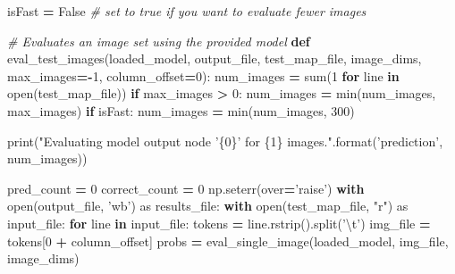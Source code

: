 \documentclass[]{book}
\newenvironment{Shaded}{\begin{snugshade}}{\end{snugshade}}
\newcommand{\KeywordTok}[1]{\textcolor[rgb]{0.13,0.29,0.53}{\textbf{#1}}}
\newcommand{\DecValTok}[1]{\textcolor[rgb]{0.00,0.00,0.81}{#1}}
\newcommand{\CharTok}[1]{\textcolor[rgb]{0.31,0.60,0.02}{#1}}
\newcommand{\SpecialCharTok}[1]{\textcolor[rgb]{0.00,0.00,0.00}{#1}}
\newcommand{\StringTok}[1]{\textcolor[rgb]{0.31,0.60,0.02}{#1}}
\newcommand{\ImportTok}[1]{#1}
\newcommand{\CommentTok}[1]{\textcolor[rgb]{0.56,0.35,0.01}{\textit{#1}}}
\newcommand{\VariableTok}[1]{\textcolor[rgb]{0.00,0.00,0.00}{#1}}
\newcommand{\ControlFlowTok}[1]{\textcolor[rgb]{0.13,0.29,0.53}{\textbf{#1}}}
\newcommand{\OperatorTok}[1]{\textcolor[rgb]{0.81,0.36,0.00}{\textbf{#1}}}
\newcommand{\BuiltInTok}[1]{#1}
\newcommand{\NormalTok}[1]{#1}
\theoremstyle{definition}
\theoremstyle{definition}
\theoremstyle{definition}
\theoremstyle{remark}
\begin{document}
\begin{Shaded}
\begin{Highlighting}[]
\NormalTok{isFast }\OperatorTok{=} \VariableTok{False} \CommentTok{# set to true if you want to evaluate fewer images}
\end{Highlighting}
\end{Shaded}

\begin{Shaded}
\begin{Highlighting}[]
\CommentTok{# Evaluates an image set using the provided model}
\KeywordTok{def}\NormalTok{ eval_test_images(loaded_model, output_file, test_map_file, }
\NormalTok{                     image_dims, max_images}\OperatorTok{=-}\DecValTok{1}\NormalTok{, column_offset}\OperatorTok{=}\DecValTok{0}\NormalTok{):}
\NormalTok{    num_images }\OperatorTok{=} \BuiltInTok{sum}\NormalTok{(}\DecValTok{1} \ControlFlowTok{for}\NormalTok{ line }\KeywordTok{in} \BuiltInTok{open}\NormalTok{(test_map_file))}
    \ControlFlowTok{if}\NormalTok{ max_images }\OperatorTok{>} \DecValTok{0}\NormalTok{:}
\NormalTok{        num_images }\OperatorTok{=} \BuiltInTok{min}\NormalTok{(num_images, max_images)}
    \ControlFlowTok{if}\NormalTok{ isFast:}
\NormalTok{        num_images }\OperatorTok{=} \BuiltInTok{min}\NormalTok{(num_images, }\DecValTok{300}\NormalTok{) }

    \BuiltInTok{print}\NormalTok{(}\StringTok{"Evaluating model output node '}\SpecialCharTok{\{0\}}\StringTok{' for }\SpecialCharTok{\{1\}}\StringTok{ images."}\NormalTok{.}\BuiltInTok{format}\NormalTok{(}\StringTok{'prediction'}\NormalTok{, num_images))}

\NormalTok{    pred_count }\OperatorTok{=} \DecValTok{0}
\NormalTok{    correct_count }\OperatorTok{=} \DecValTok{0}
\NormalTok{    np.seterr(over}\OperatorTok{=}\StringTok{'raise'}\NormalTok{)}
    \ControlFlowTok{with} \BuiltInTok{open}\NormalTok{(output_file, }\StringTok{'wb'}\NormalTok{) }\ImportTok{as}\NormalTok{ results_file:}
        \ControlFlowTok{with} \BuiltInTok{open}\NormalTok{(test_map_file, }\StringTok{"r"}\NormalTok{) }\ImportTok{as}\NormalTok{ input_file:}
            \ControlFlowTok{for}\NormalTok{ line }\KeywordTok{in}\NormalTok{ input_file:}
\NormalTok{                tokens }\OperatorTok{=}\NormalTok{ line.rstrip().split(}\StringTok{'}\CharTok{\textbackslash{}t}\StringTok{'}\NormalTok{)}
\NormalTok{                img_file }\OperatorTok{=}\NormalTok{ tokens[}\DecValTok{0} \OperatorTok{+}\NormalTok{ column_offset]}
\NormalTok{                probs }\OperatorTok{=}\NormalTok{ eval_single_image(loaded_model, img_file, image_dims)}


\end{Highlighting}
\end{Shaded}
\end{document}
